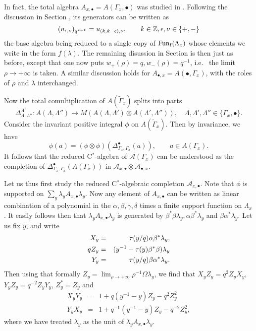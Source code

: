 In fact, the total algebra $A_{x,\bullet} = A(\Gamma_x,\bullet)$ was studied in \cite{DCY1}. Following the discussion in Section \cite{SecUni}, its generators can be written as \[(u_{\epsilon,\nu})_{q^{x+k}} =  u_{(k,k-\epsilon),\nu}, \qquad k\in \mathbb{Z},\epsilon,\nu \in \{+,-\}\] the base algebra being reduced to a single copy of $\mathrm{Fun}_{\operatorname{\mathrm{f}}}(\Lambda_x)$ whose elements we write in the form $f(\lambda)$. The remaining disussion in Section \cite{SecUni} is then just as before, except that one now puts $w_+(\rho) = q, w_-(\rho) = q^{-1}$, i.e.~ the limit $\rho\rightarrow +\infty$ is taken. A similar discussion holds for $A_{\bullet,x} = A(\bullet,\Gamma_x)$, with the roles of $\rho$ and $\lambda$ interchanged. 

Now the total comultiplication of $A(\widetilde{\Gamma}_x)$ splits into parts \[\Delta_{\Lambda,\Lambda''}^{\Lambda'}: A(\Lambda,\Lambda'')\rightarrow M(A(\Lambda,\Lambda')\otimes A(\Lambda',\Lambda'')),\quad \Lambda,\Lambda',\Lambda'' \in \{\Gamma_x,\bullet\}.\] Consider the invariant positive integral $\phi$ on $A(\widetilde{\Gamma}_x)$. Then by invariance, we have \[\phi(a) = (\phi\otimes \phi)(\Delta_{\Gamma_x,\Gamma_x}^{\bullet}(a)),\qquad a \in A(\Gamma_x).\] It follows that the reduced C$^*$-algebra of $\mathcal{A}(\Gamma_x)$ can be understood as the completion of $\Delta_{\Gamma_x,\Gamma_x}^{\bullet}(A(\Gamma_x))$ in $\mathcal{A}_{x,\bullet}\otimes \mathcal{A}_{\bullet,x}$. 

Let us thus first study the reduced C$^*$-algebraic completion $\mathcal{A}_{x,\bullet}$. Note that $\phi$ is supported on $\sum_y \lambda_y A_{x,\bullet}\lambda_y$. Now any element of $A_{x,\bullet}$ can be written as linear combination of a polynomial in the $\alpha,\beta,\gamma,\delta$ times a finite support function on $\Lambda_x$. It easily follows then that $\lambda_y A_{x,\bullet}\lambda_y$ is generated by $\beta^*\beta\lambda_y,\alpha\beta^*\lambda_y$ and $\beta\alpha^*\lambda_y$. Let us fix $y$, and write \begin{eqnarray*} X_y &=& \operatorname{\tau}(y/q)\alpha \beta^*\lambda_y,\\ qZ_y &=& (y^{-1}-\operatorname{\tau}(y)\beta^*\beta)\lambda_y\\ Y_y &=& \operatorname{\tau}(y/q)\beta \alpha^*\lambda_y.\end{eqnarray*}  Then using that formally $Z_y = \lim_{\rho\rightarrow +\infty} \rho^{-1}\Omega \lambda_y$, we find that $X_yZ_y = q^2Z_yX_y$, $Y_yZ_y= q^{-2}Z_yY_y$, $Z_y^*=Z_y$ and \begin{eqnarray*} X_yY_y &=& 1+ q (y^{-1}-y)Z_y -  q^2 Z_y^2 \\ Y_yX_y &=& 1+ q^{-1}(y^{-1}-y)Z_y-q^{-2}Z_y^2,
\end{eqnarray*}
where we have treated $\lambda_y$ as the unit of $\lambda_y A_{x,\bullet}\lambda_y$.

